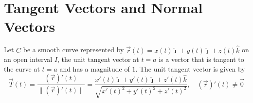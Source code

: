 \documentclass{report}
\begin{document}
\newpage

\chapter {Tangent Vectors and Normal Vectors}

Let $C$ be a smooth curve represented by $\vec{r}(t) = x(t)\hat{\imath} +
    y(t)\hat{\jmath} + z(t)\hat{k}$ on an open interval $I$, the unit tangent
vector at $t = a$ is a vector that is tangent to the curve at $t = a$ and has a
magnitude of $1$. The unit tangent vector is given by \[\vec{T}(t) = \frac{(\vec{r})'(t)}{\lVert(\vec{r})'(t)\rVert} = \frac{x'(t)\hat{\imath} + y'(t)\hat{\jmath} + z'(t)\hat{k}}{\sqrt{x'(t)^2 + y'(t)^2 + z'(t)^2}}, \quad (\vec{r})'(t) \neq \vec{0}\]
\end{document}
